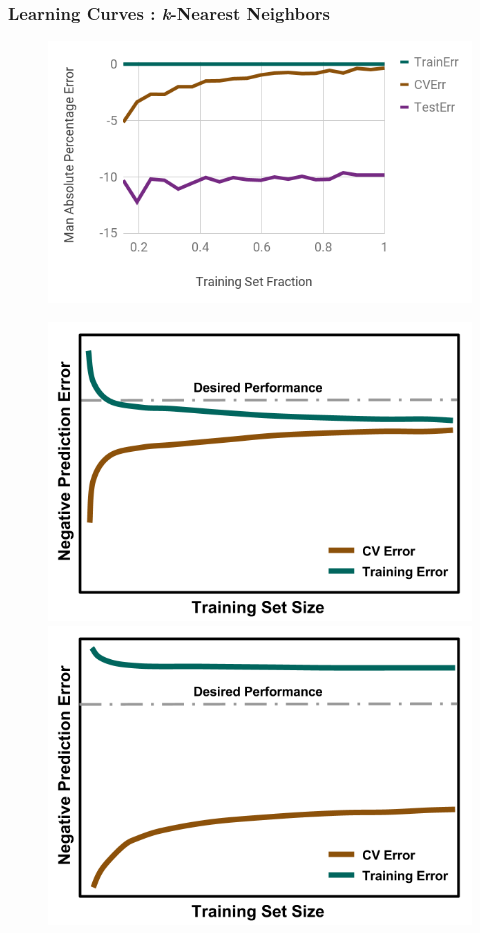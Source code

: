 \begin{frame}
  \frametitle{Learning Curves : \textit{k}-Nearest Neighbors}
  \begin{figure}
    \begin{minipage}{0.65\textwidth}
      \centering
      \includegraphics[width=\linewidth]{./figures/nn-learn.png}
    \end{minipage}%
    \begin{minipage}{0.35\textwidth}
      \centering
      \includegraphics[width=\linewidth]{./figures/NegLearningCurve-ideal.png}
      \includegraphics[width=\linewidth]{./figures/NegLearningCurve-variance.png}

\end{minipage}
\end{figure}
\end{frame}
